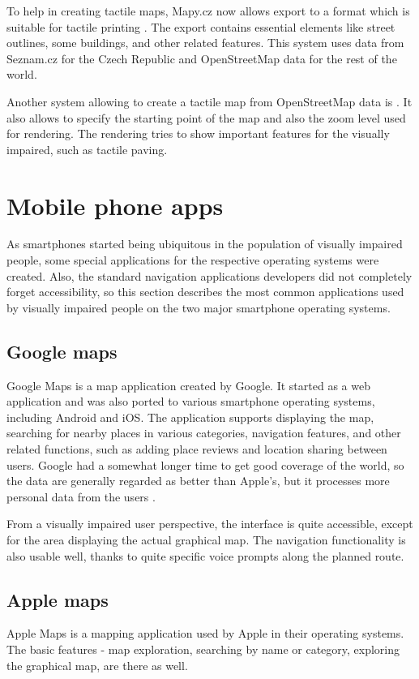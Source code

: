 \documentclass[nolof,digital]{fithesis3}
\begin{document}
To help in creating tactile maps, Mapy.cz now allows export to a format which is suitable for tactile printing \parencite{mapycz}. The export contains essential elements like street outlines, some buildings, and other related features. This system uses data from Seznam.cz for the Czech Republic and OpenStreetMap data for the rest of the world.

Another system allowing to create a tactile map from OpenStreetMap data is \parencite{tactile_osm_maps}. It also allows to specify the starting point of the map and also the zoom level used for rendering. The rendering tries to show important features for the visually impaired, such as tactile paving.
\section{Mobile phone apps}
As smartphones started being ubiquitous in the population of visually impaired people, some special applications for the respective operating systems were created. Also, the standard navigation applications developers did not completely forget accessibility, so this section describes the most common applications used by visually impaired people on the two major smartphone operating systems.
\subsection{Google maps}
Google Maps \parencite{googlemaps} is a map application created by Google. It started as a web application and was also ported to various smartphone operating systems, including Android and iOS. The application supports displaying the map, searching for nearby places in various categories, navigation features, and other related functions, such as adding place reviews and location sharing between users. Google had a somewhat longer time to get good coverage of the world, so the data are generally regarded as better than Apple's, but it processes more personal data from the users \parencite{mapcomp}.

From a visually impaired user perspective, the interface is quite accessible, except for the area displaying the actual graphical map. The navigation functionality is also usable well, thanks to quite specific voice prompts along the planned route.
\subsection{Apple maps}
Apple Maps \parencite{applemaps} is a mapping application used by Apple in their operating systems. The basic features - map exploration, searching by name or category, exploring the graphical map, are there as well.
\end{document}

